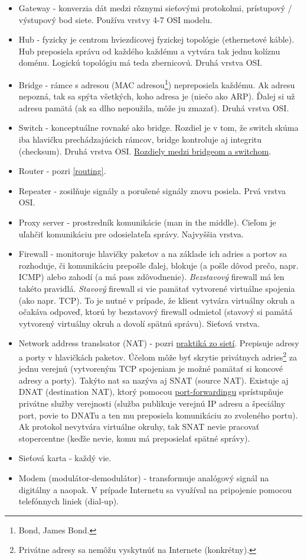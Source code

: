 \documentclass[10pt,a4paper]{article}
\begin{document}
\begin{itemize}
\item Gateway - konverzia dát medzi rôznymi sieťovými protokolmi, prístupový / výstupový bod siete. Používa vrstvy 4-7 OSI modelu. 
\item Hub - fyzicky je centrom hviezdicovej fyzickej topológie (ethernetové káble). Hub preposiela správu od každého každému a vytvára tak jednu kolíznu doménu. Logickú topológiu má teda zbernicovú. Druhá vrstva OSI. 
\item Bridge - rámce s adresou (MAC adresou\footnote{
Bond, James Bond. 
}) nepreposiela každému. Ak adresu nepozná, tak sa spýta všetkých, koho adresa je (niečo ako ARP). Ďalej si už adresu pamätá (ak sa dlho nepoužila, môže ju zmazať). Druhá vrstva OSI. 
\item Switch - konceptuálne rovnaké ako bridge. Rozdiel je v tom, že switch skúma iba hlavičku prechádzajúcich rámcov, bridge kontroluje aj integritu (checksum). Druhá vrstva OSI. \href{http://en.wikipedia.org/wiki/Ethernet#Bridging_and_switching}{Rozdiely medzi bridgeom a switchom}. 
\item Router - pozri \ref{routing}. 
\item Repeater - zosilňuje signály a porušené signály znovu posiela. Prvá vrstva OSI. 
\item Proxy server - prostredník komunikácie (man in the middle). Cieľom je uľahčiť komunikáciu pre odosielateľa správy. Najvyššia vrstva.  
\label{firewall} 
\item Firewall - monitoruje hlavičky paketov a na základe ich adries a portov sa rozhoduje, či komunikáciu prepošle ďalej, blokuje (a pošle dôvod prečo, napr. ICMP) alebo zahodí (a má pass zdôvodnenie). \emph{Bezstavový} firewall má len takéto pravidlá. \emph{Stavový} firewall si vie pamätať vytvorené virtuálne spojenia (ako napr. TCP). To je nutné v prípade, že klient vytvára virtuálny okruh a očakáva odpoveď, ktorú by bezstavový firewall odmietol (stavový si pamätá vytvorený virtuálny okruh a dovolí spätnú správu). Sieťová vrstva.
\label{NAT}
\item Network address translsator (NAT) - pozri \href{http://netlab.dcs.fmph.uniba.sk/siete/cviko8/}{praktiká zo sietí}. Prepisuje adresy a porty v hlavičkách paketov. Účelom môže byť skrytie privátnych adries\footnote{
Privátne adresy sa nemôžu vyskytnúť na Internete (konkrétny). 
} za jednu verejnú (vytvoreným TCP spojeniam je možné pamätať si koncové adresy a porty). Takýto nat sa nazýva aj SNAT (source NAT). Existuje aj DNAT (destination NAT), ktorý pomocou \href{http://en.wikipedia.org/wiki/Port_forwarding}{port-forwardingu} sprístupňuje privátne služby verejnosti (služba publikuje verejnú IP adresu a špeciálny port, povie to DNATu a ten mu preposiela komunikáciu zo zvoleného portu). Ak protokol nevytvára virtuálne okruhy, tak SNAT nevie pracovať stopercentne (keďže nevie, komu má preposielať spätné správy).  
\item Sieťová karta - každý vie. 
\item Modem (modulátor-demodulátor) - transformuje analógový signál na digitálny a naopak. V prípade Internetu sa využíval na pripojenie pomocou telefónnych liniek (dial-up).
\end{itemize}
 
\end{document}
